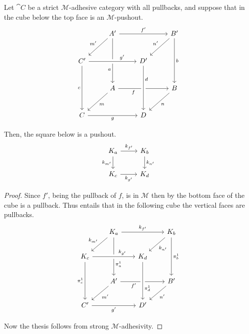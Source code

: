 \begin{lemma}\label{lemma:pushouts_kernel_pairs}
	Let $\cat C$ be a strict $\mathcal{M}$-adhesive category with all pullbacks, and suppose that in the cube below the top face is an $\mathcal{M}$-pushout.
	\[\begin{tikzcd}[row sep=25, column sep=25]
		& {A'} && {B'} \\
		{C'} && {D'} \\
		& A && B \\
		C && D
		\arrow["{f'}", from=1-2, to=1-4]
		\arrow["{m'}"', from=1-2, to=2-1]
		\arrow["a"'{pos=0.7}, from=1-2, to=3-2]
		\arrow["{n'}"', from=1-4, to=2-3]
		\arrow["b", from=1-4, to=3-4]
		\arrow["{g'}"{pos=0.7}, from=2-1, to=2-3, crossing over]
		\arrow["c"', from=2-1, to=4-1]
		\arrow["f"'{pos=0.3}, from=3-2, to=3-4]
		\arrow["d"{pos=0.3}, from=2-3, to=4-3, crossing over]
		\arrow["m", from=3-2, to=4-1]
		\arrow["n", from=3-4, to=4-3]
		\arrow["g"', from=4-1, to=4-3]
	\end{tikzcd}\]
	
	Then, the square below is a pushout.
	\[
	\begin{tikzcd}%
		{K_a} \ar[r, "{k_{f'}}"] \ar[d, "{k_{m'}}"'] & {K_b} \ar[d, "{k_{n'}}"] \\
		{K_c} \ar[r, "{k_{g'}}"'] & {K_d}
	\end{tikzcd}
	\]
\end{lemma}

\begin{proof}
	Since $f'$, being the pullback of $f$, is in $\mathcal{M}$ then by   the bottom face of the cube is a pullback. Thus  entails that in the following cube the vertical faces are pullbacks.
	\[\begin{tikzcd}[row sep = 20, column sep = 20]
		& {K_a} && {K_b} \\
		{K_c} && {K_d} \\
		& {A'} && {B'} \\
		{C'} && {D'}
		\arrow["{k_{f'}}", from=1-2, to=1-4]
		\arrow["{k_{m'}}"', from=1-2, to=2-1]
		\arrow["{\pi_a^1}"{pos=0.7}, from=1-2, to=3-2]
		\arrow["{k_{n'}}", from=1-4, to=2-3]
		\arrow["{\pi_b^1}", from=1-4, to=3-4]
		\arrow["{k_{g'}}"{pos=0.7}, from=2-1, to=2-3, crossing over]
		\arrow["{\pi_c^1}"', from=2-1, to=4-1]
		\arrow["{f'}"'{pos=0.3}, from=3-2, to=3-4]
		\arrow["{\pi_d^1}"{pos=0.7}, from=2-3, to=4-3, crossing over]
		\arrow["{m'}", from=3-2, to=4-1]
		\arrow["{n'}", from=3-4, to=4-3]
		\arrow["{g'}"', from=4-1, to=4-3]
	\end{tikzcd}\]
	
Now the thesis follows from strong $\mathcal{M}$-adhesivity.
\end{proof}


